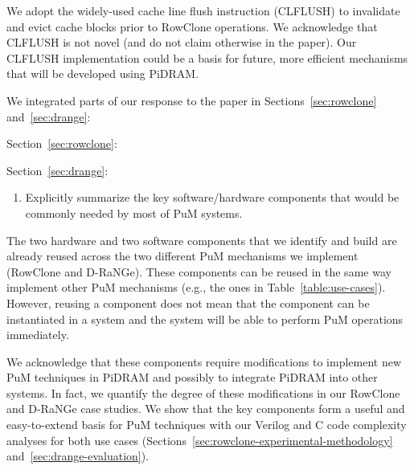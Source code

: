 We adopt the widely-used cache line flush instruction (CLFLUSH) to invalidate and evict cache blocks prior to RowClone operations. We acknowledge that CLFLUSH is not novel (and do not claim otherwise in the paper). Our CLFLUSH implementation could be a basis for future, more efficient mechanisms that will be developed using PiDRAM.

We integrated parts of our response to the paper in Sections~\ref{sec:rowclone} and~\ref{sec:drange}: 

Section~\ref{sec:rowclone}:

\vspace{5pt}
\yyboxbegin 
{}
\yyboxend 

Section~\ref{sec:drange}:

\vspace{5pt}
\yyboxbegin 
{}
\yyboxend 

\newpage

\begin{tcolorbox}
    \begin{enumerate}[label=R3/\arabic*]
        \addtocounter{enumi}{1}
        \item \label{q:r3q2} Explicitly summarize the key software/hardware components that would be commonly needed by most of PuM systems. 
    \end{enumerate}
\end{tcolorbox} 

The two hardware  and two software components  that we identify and build are already reused across the two different PuM mechanisms we implement (RowClone and D-RaNGe). These components can be reused in the same way  implement other PuM mechanisms (e.g., the ones in Table~\ref{table:use-cases}). However, reusing a component does not mean that the component can  be instantiated in a system and the system will be able to perform PuM operations immediately. 

We acknowledge that these components require modifications to implement new PuM techniques in PiDRAM and possibly to integrate PiDRAM into other systems. In fact, we quantify the degree of these modifications in our RowClone and D-RaNGe case studies. We show that the key components form a useful and easy-to-extend basis for PuM techniques with our Verilog and C code complexity analyses for both use cases (Sections~\ref{sec:rowclone-experimental-methodology} and~\ref{sec:drange-evaluation}).

